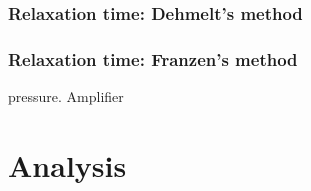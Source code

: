 \documentclass{article}
\begin{document}
\subsubsection{Relaxation time: Dehmelt’s method}
\subsubsection{Relaxation time: Franzen’s method}
pressure.
Amplifier
\section{Analysis}
\end{document}
